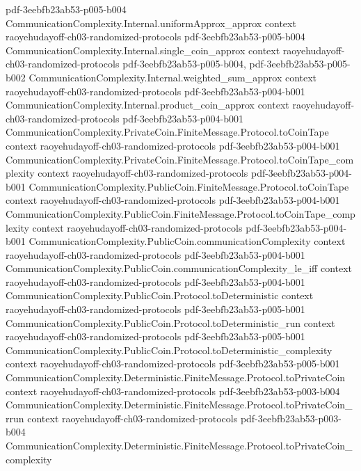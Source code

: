 \begin{theorem}
  {pdf-3eebfb23ab53-p005-b004}
\proofstep
  {CommunicationComplexity.Internal.uniformApprox_approx}
  {context}
  {raoyehudayoff-ch03-randomized-protocols}
  {pdf-3eebfb23ab53-p005-b004}
\proofstep
  {CommunicationComplexity.Internal.single_coin_approx}
  {context}
  {raoyehudayoff-ch03-randomized-protocols}
  {pdf-3eebfb23ab53-p005-b004,
    pdf-3eebfb23ab53-p005-b002}
\proofstep
  {CommunicationComplexity.Internal.weighted_sum_approx}
  {context}
  {raoyehudayoff-ch03-randomized-protocols}
  {pdf-3eebfb23ab53-p004-b001}
\proofstep
  {CommunicationComplexity.Internal.product_coin_approx}
  {context}
  {raoyehudayoff-ch03-randomized-protocols}
  {pdf-3eebfb23ab53-p004-b001}
\proofstep
  {CommunicationComplexity.PrivateCoin.FiniteMessage.Protocol.toCoinTape}
  {context}
  {raoyehudayoff-ch03-randomized-protocols}
  {pdf-3eebfb23ab53-p004-b001}
\proofstep
  {CommunicationComplexity.PrivateCoin.FiniteMessage.Protocol.toCoinTape_complexity}
  {context}
  {raoyehudayoff-ch03-randomized-protocols}
  {pdf-3eebfb23ab53-p004-b001}
\proofstep
  {CommunicationComplexity.PublicCoin.FiniteMessage.Protocol.toCoinTape}
  {context}
  {raoyehudayoff-ch03-randomized-protocols}
  {pdf-3eebfb23ab53-p004-b001}
\proofstep
  {CommunicationComplexity.PublicCoin.FiniteMessage.Protocol.toCoinTape_complexity}
  {context}
  {raoyehudayoff-ch03-randomized-protocols}
  {pdf-3eebfb23ab53-p004-b001}
\proofstep
  {CommunicationComplexity.PublicCoin.communicationComplexity}
  {context}
  {raoyehudayoff-ch03-randomized-protocols}
  {pdf-3eebfb23ab53-p004-b001}
\proofstep
  {CommunicationComplexity.PublicCoin.communicationComplexity_le_iff}
  {context}
  {raoyehudayoff-ch03-randomized-protocols}
  {pdf-3eebfb23ab53-p004-b001}
\proofstep
  {CommunicationComplexity.PublicCoin.Protocol.toDeterministic}
  {context}
  {raoyehudayoff-ch03-randomized-protocols}
  {pdf-3eebfb23ab53-p005-b001}
\proofstep
  {CommunicationComplexity.PublicCoin.Protocol.toDeterministic_run}
  {context}
  {raoyehudayoff-ch03-randomized-protocols}
  {pdf-3eebfb23ab53-p005-b001}
\proofstep
  {CommunicationComplexity.PublicCoin.Protocol.toDeterministic_complexity}
  {context}
  {raoyehudayoff-ch03-randomized-protocols}
  {pdf-3eebfb23ab53-p005-b001}
\proofstep
  {CommunicationComplexity.Deterministic.FiniteMessage.Protocol.toPrivateCoin}
  {context}
  {raoyehudayoff-ch03-randomized-protocols}
  {pdf-3eebfb23ab53-p003-b004}
\proofstep
  {CommunicationComplexity.Deterministic.FiniteMessage.Protocol.toPrivateCoin_rrun}
  {context}
  {raoyehudayoff-ch03-randomized-protocols}
  {pdf-3eebfb23ab53-p003-b004}
\proofstep
  {CommunicationComplexity.Deterministic.FiniteMessage.Protocol.toPrivateCoin_complexity}

\end{theorem}
